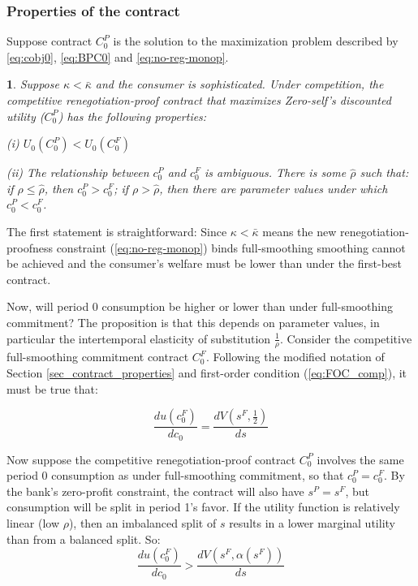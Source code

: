\documentclass[11pt,english]{article}
\theoremstyle{plain}
\newtheorem{prop}{\protect\propositionname}
\theoremstyle{definition}
\providecommand{\propositionname}{Proposition}
\begin{document}
\subsubsection{Properties of the contract}

Suppose contract $C_{0}^{P}$ is the solution to the maximization
problem described by \ref{eq:cobj0}, \ref{eq:BPC0} and \ref{eq:no-reg-monop}. 
\begin{prop}
Suppose $\kappa<\bar{\kappa}$ and the consumer is sophisticated.
Under competition, the competitive renegotiation-proof contract that
maximizes Zero-self's discounted utility ($C_{0}^{P}$) has the following
properties:

(i) $U_{0}\left(C_{0}^{P}\right)<U_{0}\left(C_{0}^{F}\right)$

(ii) The relationship between $c_{0}^{P}$ and $c_{0}^{F}$ is ambiguous.
There is some $\hat{\rho}$ such that: if $\rho\leq\hat{\rho}$, then
$c_{0}^{P}>c_{0}^{F}$; if $\rho>\hat{\rho}$, then there are parameter
values under which $c_{0}^{P}<c_{0}^{F}$. 
\end{prop}
The first statement is straightforward: Since $\kappa<\bar{\kappa}$
means the new renegotiation-proofness constraint (\ref{eq:no-reg-monop})
binds full-smoothing smoothing cannot be achieved and the consumer's
welfare must be lower than under the first-best contract.

Now, will period 0 consumption be higher or lower than under full-smoothing
commitment? The proposition is that this depends on parameter values,
in particular the intertemporal elasticity of substitution $\frac{1}{\rho}$.
Consider the competitive full-smoothing commitment contract $C_{0}^{F}$.
Following the modified notation of Section \ref{sec_contract_properties}
and first-order condition (\ref{eq:FOC_comp}), it must be true that:

\begin{equation}
\frac{du\left(c_{0}^{F}\right)}{dc_{0}}=\frac{dV\left(s^{F},\frac{1}{2}\right)}{ds}
\end{equation}

Now suppose the competitive renegotiation-proof contract $C_{0}^{P}$
involves the same period 0 consumption as under full-smoothing commitment,
so that $c_{0}^{P}=c_{0}^{F}$. By the bank's zero-profit constraint,
the contract will also have $s^{P}=s^{F}$, but consumption will be
split in period 1's favor. If the utility function is relatively linear
(low $\rho$), then an imbalanced split of $s$ results in a lower
marginal utility than from a balanced split. So: 
\begin{equation}
\frac{du\left(c_{0}^{F}\right)}{dc_{0}}>\frac{dV\left(s^{F},\alpha\left(s^{F}\right)\right)}{ds}
\end{equation}
\end{document}
